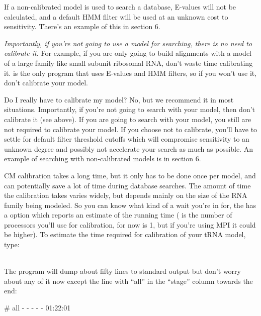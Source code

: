 If a non-calibrated model is used to search a database, E-values will not
be calculated, and a default HMM filter will be used at an unknown
cost to sensitivity. There's an example of this in section 6. 

\emph{Importantly, if you're not going to use a model for searching,
there is no need to calibrate it.} For example, if you are only going
to build alignments with a model of a large family like small subunit
ribosomal RNA, don't waste time calibrating it.  is the
only  program that uses E-values and HMM filters,
so if you won't use it, don't calibrate your model.

\begin{srefaq}{Do I really have to calibrate my model?} No, but we
  recommend it in most situations. Importantly, if you're not going to
  search with your model, then don't calibrate it (see above). If you
  are going to search with your model, you still are not required to
  calibrate your model. If you choose not to calibrate, you'll have to
  settle for default filter threshold cutoffs which will compromise
  sensitivity to an unknown degree and possibly not accelerate your
  search as much as possible. An example of
  searching with non-calibrated models is in section 6.
\end{srefaq}

CM calibration takes a long time, but it only has
to be done once per model, and can potentially save a lot of time
during database searches. The amount of time the calibration takes
varies widely, but depends mainly on the size of the RNA family being
modeled. 
So you can know what kind of a wait you're in for, the
 has a  option which reports an
estimate of the running time ( is the number of processors
you'll use for calibration, for now 
is 1, but if you're using MPI it could be higher). To estimate the
time required for calibration of your tRNA
model, type:

\\

The program will dump about fifty lines to standard output but 
don't worry about any of it now except the line with ``all'' in the
``stage'' column towards the end:

\begin{sreoutput}
# all         -    -    -          -      -       01:22:01
\end{sreoutput}

